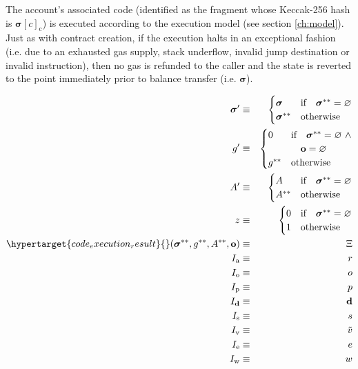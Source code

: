 \documentclass[9pt,oneside]{amsart}
\begin{document}
\begin{multicols}{2}
The account's associated code (identified as the fragment whose Keccak-256 hash is $\boldsymbol{\sigma}[c]_{\mathrm{c}}$) is executed according to the execution model (see section \ref{ch:model}). Just as with contract creation, if the execution halts in an exceptional fashion (i.e. due to an exhausted gas supply, stack underflow, invalid jump destination or invalid instruction), then no gas is refunded to the caller and the state is reverted to the point immediately prior to balance transfer (i.e. $\boldsymbol{\sigma}$).

\begin{eqnarray}
\boldsymbol{\sigma}' & \equiv & \begin{cases}
\boldsymbol{\sigma} & \text{if} \quad \boldsymbol{\sigma}^{**} = \varnothing \\
\boldsymbol{\sigma}^{**} & \text{otherwise}
\end{cases} \\
g' & \equiv & \begin{cases}
0 & \text{if} \quad \boldsymbol{\sigma}^{**} = \varnothing \ \wedge \\
&\quad \mathbf{o} = \varnothing \\
g^{**} & \text{otherwise}
\end{cases} \\
A' & \equiv & \begin{cases}
A & \text{if} \quad \boldsymbol{\sigma}^{**} = \varnothing \\
A^{**} & \text{otherwise}
\end{cases} \\
z & \equiv & \begin{cases}
0 & \text{if} \quad \boldsymbol{\sigma}^{**} = \varnothing \\
1 & \text{otherwise}
\end{cases} \\
\hypertarget{code_execution_result}{}
(\boldsymbol{\sigma}^{**}, g^{**}, A^{**}, \mathbf{o}) & \equiv & \Xi\\
I_{\mathrm{a}} & \equiv & r \\
I_{\mathrm{o}} & \equiv & o \\
I_{\mathrm{p}} & \equiv & p \\
I_{\mathbf{d}} & \equiv & \mathbf{d} \\
I_{\mathrm{s}} & \equiv & s \\
I_{\mathrm{v}} & \equiv & \tilde{v} \\
I_{\mathrm{e}} & \equiv & e \\
I_{\mathrm{w}} & \equiv & w

\end{eqnarray}
\end{multicols}
\end{document}
